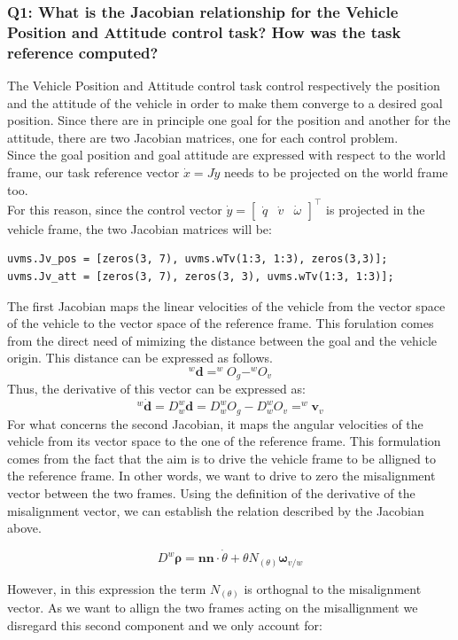 \documentclass{article}
\begin{document}
\subsubsection{Q1: What is the Jacobian relationship for the Vehicle Position and Attitude control task? How was the task reference computed?}
The Vehicle Position and Attitude control task control respectively the position and the attitude of the vehicle in order to make them converge to a desired goal position. Since there are in principle one goal for the position and another for the attitude, there are two Jacobian matrices, one for each control problem. \\
Since the goal position and goal attitude are expressed with respect to the world frame, our task reference vector $ \dot{x} = J\dot{y} $ needs to be projected on the world frame too. \\
For this reason, since the control vector $ \dot{y} = \begin{bmatrix} \dot{q} & \dot{v} & \dot{\omega}\end{bmatrix}^\top $ is projected in the vehicle frame, the two Jacobian matrices will be:
\begin{lstlisting}
uvms.Jv_pos = [zeros(3, 7), uvms.wTv(1:3, 1:3), zeros(3,3)]; 
uvms.Jv_att = [zeros(3, 7), zeros(3, 3), uvms.wTv(1:3, 1:3)];
\end{lstlisting}

The first Jacobian maps the linear velocities of the vehicle from the vector space of the vehicle to the vector space of the reference frame. This forulation comes from the direct need of mimizing the distance between the goal and the vehicle origin. This distance can be expressed as follows. 
$$
	^w\bm{d} = ^wO_g - ^wO_v
$$
 Thus, the derivative of this vector can be expressed as:
$$
	^w\dot{\bm{d}} = D_w ^w\bm{d} = D_w ^wO_g - D_w ^wO_v = ^w\bm{v}_v
$$
For what concerns the second Jacobian, it maps the angular velocities of the vehicle from its vector space to the one of the reference frame. This formulation comes from the fact that the aim is to drive the vehicle frame to be alligned to the reference frame. In other words, we want to drive to zero the misalignment vector between the two frames. Using the definition of the derivative of the misalignment vector, we can establish the relation described by the Jacobian above. 

$$
D^w \bm{\rho} = \bm{n}\bm{n}\cdot \dot{\theta} + \theta N_(\theta) \bm{\omega}_{v/w}
$$

However, in this expression the term $N_(\theta)$ is orthognal to the misalignment vector. As we want to allign the two frames acting on the misallignment we disregard this second component and we only account for:
 
\end{document}
